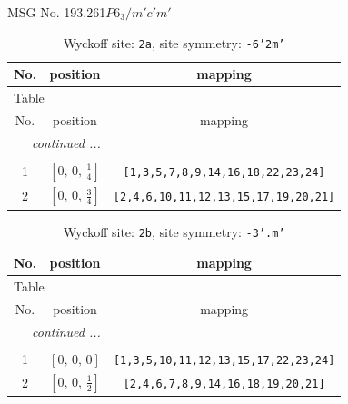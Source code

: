 \documentclass[fleqn,8pt]{jsarticle}
\begin{document}
\setcounter{MaxMatrixCols}{32}

\renewcommand{\tablename}{Table~}
\renewcommand{\figurename}{Figure~}
\begin{center}
\LARGE
MSG No. 193.261\quad$P6_{3}/m'c'm'$
\end{center}
\renewcommand{\arraystretch}{1.2}
\begin{longtable}{ccc}
\caption{Wyckoff site: {\tt 2a}, site symmetry: {\tt -6'2m'}}
 \\
 \hline \hline
No. & position & mapping \\ \hline \endfirsthead

\multicolumn{2}{l}{\tablename\ \thetable{}} \\
 \hline \hline
No. & position & mapping \\ \hline \endhead

 \hline \hline
\multicolumn{2}{r}{\footnotesize\it continued ...} \\ \endfoot

 \hline \hline
\multicolumn{2}{r}{} \\ \endlastfoot

1 & $\left[ 0,\, 0,\, \frac{1}{4} \right]$ & {\tt [1,3,5,7,8,9,14,16,18,22,23,24]} \\ \hline
2 & $\left[ 0,\, 0,\, \frac{3}{4} \right]$ & {\tt [2,4,6,10,11,12,13,15,17,19,20,21]} \\
\end{longtable}
\renewcommand{\arraystretch}{1.2}
\begin{longtable}{ccc}
\caption{Wyckoff site: {\tt 2b}, site symmetry: {\tt -3'.m'}}
 \\
 \hline \hline
No. & position & mapping \\ \hline \endfirsthead

\multicolumn{2}{l}{\tablename\ \thetable{}} \\
 \hline \hline
No. & position & mapping \\ \hline \endhead

 \hline \hline
\multicolumn{2}{r}{\footnotesize\it continued ...} \\ \endfoot

 \hline \hline
\multicolumn{2}{r}{} \\ \endlastfoot

1 & $\left[ 0,\, 0,\, 0 \right]$ & {\tt [1,3,5,10,11,12,13,15,17,22,23,24]} \\ \hline
2 & $\left[ 0,\, 0,\, \frac{1}{2} \right]$ & {\tt [2,4,6,7,8,9,14,16,18,19,20,21]} \\
\end{longtable}
\end{document}
